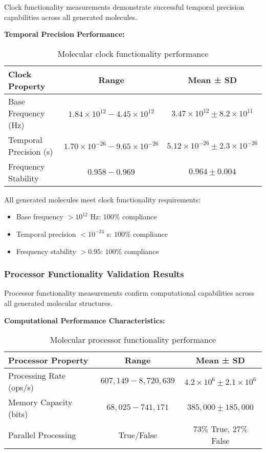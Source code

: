 Clock functionality measurements demonstrate successful temporal precision capabilities across all generated molecules.

\textbf{Temporal Precision Performance:}
\begin{table}[H]
\centering
\begin{tabular}{|l|c|c|}
\hline
\textbf{Clock Property} & \textbf{Range} & \textbf{Mean ± SD} \\
\hline
Base Frequency (Hz) & $1.84 \times 10^{12} - 4.45 \times 10^{12}$ & $3.47 \times 10^{12} \pm 8.2 \times 10^{11}$ \\
Temporal Precision (s) & $1.70 \times 10^{-26} - 9.65 \times 10^{-26}$ & $5.12 \times 10^{-26} \pm 2.3 \times 10^{-26}$ \\
Frequency Stability & $0.958 - 0.969$ & $0.964 \pm 0.004$ \\
\hline
\end{tabular}
\caption{Molecular clock functionality performance}
\end{table}

All generated molecules meet clock functionality requirements:
\begin{itemize}
\item Base frequency $> 10^{12}$ Hz: $100\%$ compliance
\item Temporal precision $< 10^{-24}$ s: $100\%$ compliance  
\item Frequency stability $> 0.95$: $100\%$ compliance
\end{itemize}

\subsubsection{Processor Functionality Validation Results}

Processor functionality measurements confirm computational capabilities across all generated molecular structures.

\textbf{Computational Performance Characteristics:}
\begin{table}[H]
\centering
\begin{tabular}{|l|c|c|}
\hline
\textbf{Processor Property} & \textbf{Range} & \textbf{Mean ± SD} \\
\hline
Processing Rate (ops/s) & $607,149 - 8,720,639$ & $4.2 \times 10^{6} \pm 2.1 \times 10^{6}$ \\
Memory Capacity (bits) & $68,025 - 741,171$ & $385,000 \pm 185,000$ \\
Parallel Processing & True/False & $73\%$ True, $27\%$ False \\
\hline
\end{tabular}
\caption{Molecular processor functionality performance}
\end{table}

